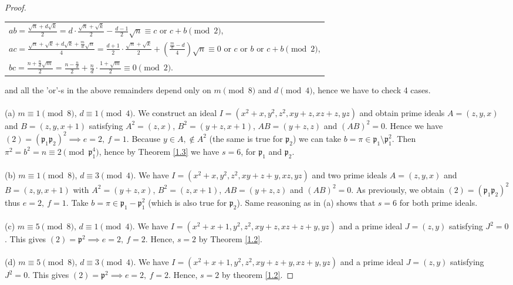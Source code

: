 \documentclass[10pt,a4paper]{amsart}
\begin{document}
\begin{proof}
\begin{center}
\begin{tabular}{@{}l@{}}
$ab = \frac{\sqrt{n} + d\sqrt{k}}{2} = d \cdot \frac{\sqrt{n}+\sqrt{k}}{2} - \frac{d-1}{2} \sqrt{n} \equiv c \text{ or } c+b \pmod{2}$,\\
$ac = \frac{\sqrt{n} + \sqrt{k} + d\sqrt{k} + \frac{m}{d} \sqrt{n} }{4} =  \frac{d+1}{2} \cdot \frac{\sqrt{n}+\sqrt{k}}{2} + (\frac{\frac{m}{d}-d}{4})\sqrt{n} \equiv 0 \text{ or } c \text{ or } b \text{ or } c+b \pmod{2}$,\\
$bc = \frac{n + \frac{n}{d}\sqrt{m}}{2} = \frac{n - \frac{n}{d}}{2} + \frac{n}{d} \cdot \frac{1+ \sqrt{m}}{2} \equiv 0 \pmod{2} $.
\end{tabular}
\end{center}
and all the 'or'-s in the above remainders depend only on $m \pmod{8}$ and $d \pmod{4}$, hence we have to check 4 cases.
\\ \\
(a) $m \equiv 1 \pmod{8}$, $d \equiv 1 \pmod{4}$. We construct an ideal
$I = (x^2+x,y^2,z^2,xy+z,xz+z,yz)$ and obtain prime ideals $A = (z,y,x)$ and $B = (z,y,x+1)$ satisfying $A^2 = (z,x)$, $B^2=(y+z,x+1)$, $AB = (y+z,z)$ and $(AB)^2 = 0$. Hence we have $(2) = (\mathfrak{p}_1\mathfrak{p}_2)^2 \implies e=2, \ f=1$.  Because $y \in A, \not\in A^2$ (the same is true for $\mathfrak{p}_2$) we can take $b = \pi \in \mathfrak{p}_1 \setminus \mathfrak{p}_1^2$. Then  $\pi^2 = b^2 = n \equiv 2 \pmod{\mathfrak{p}_1^4}$, hence by Theorem \ref{1.3} we have $s=6$, for $\mathfrak{p}_1$ and $\mathfrak{p}_2$.
\\ \\
(b) $m \equiv 1 \pmod{8}$, $d \equiv 3 \pmod{4}$. We have $I = (x^2+x,y^2,z^2,xy+z+y,xz,yz)$ and two prime ideals $A = (z,y,x)$ and $B=(z,y,x+1)$ with $A^2 = (y+z,x)$, $B^2 = (z,x+1)$, $AB = (y+z,z)$ and $(AB)^2 = 0$. As previously, we obtain $(2) = (\mathfrak{p}_1\mathfrak{p}_2)^2$ thus $e=2, \ f=1$. Take $b = \pi \in \mathfrak{p}_1 - \mathfrak{p}_1^2$ (which is also true for $\mathfrak{p}_2$). Same reasoning as in (a) shows that $s=6$ for both prime ideals.
\\ \\
(c) $m \equiv 5 \pmod{8}$, $d \equiv 1 \pmod{4}$. We have $I = (x^2+x+1,y^2,z^2,xy+z,xz+z+y,yz)$ and a prime ideal $J = (z,y)$ satisfying $J^2=0$. This gives $(2) = \mathfrak{p}^2 \implies e=2,\ f=2.$ Hence, $ s=2$ by Theorem \ref{1.2}.
\\ \\
(d) $m \equiv 5 \pmod{8}$, $d \equiv 3 \pmod{4}$. We have $I = (x^2+x+1,y^2,z^2,xy+z+y,xz+y,yz)$ and a prime ideal $J = (z,y)$ satisfying $J^2=0$. This gives $(2) = \mathfrak{p}^2 \implies e=2,\ f=2$. Hence, $s=2$ by theorem \ref{1.2}.

\end{proof}
\end{document}
